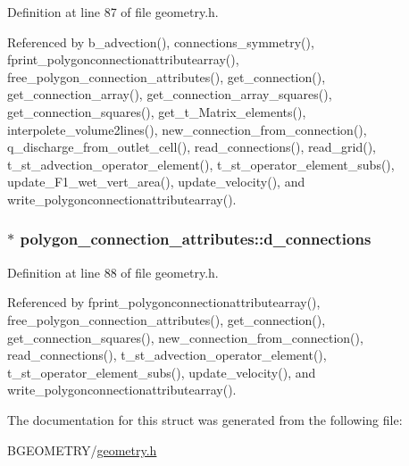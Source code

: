 Definition at line 87 of file geometry.\-h.



Referenced by b\-\_\-advection(), connections\-\_\-symmetry(), fprint\-\_\-polygonconnectionattributearray(), free\-\_\-polygon\-\_\-connection\-\_\-attributes(), get\-\_\-connection(), get\-\_\-connection\-\_\-array(), get\-\_\-connection\-\_\-array\-\_\-squares(), get\-\_\-connection\-\_\-squares(), get\-\_\-t\-\_\-\-Matrix\-\_\-elements(), interpolete\-\_\-volume2lines(), new\-\_\-connection\-\_\-from\-\_\-connection(), q\-\_\-discharge\-\_\-from\-\_\-outlet\-\_\-cell(), read\-\_\-connections(), read\-\_\-grid(), t\-\_\-st\-\_\-advection\-\_\-operator\-\_\-element(), t\-\_\-st\-\_\-operator\-\_\-element\-\_\-subs(), update\-\_\-\-F1\-\_\-wet\-\_\-vert\-\_\-area(), update\-\_\-velocity(), and write\-\_\-polygonconnectionattributearray().

\hypertarget{structpolygon__connection__attributes_a488769495fb2d8b79ae938414893f5b2}{
\subsubsection[{d\-\_\-connections}]{$\ast$ polygon\-\_\-connection\-\_\-attributes\-::d\-\_\-connections}}\label{structpolygon__connection__attributes_a488769495fb2d8b79ae938414893f5b2}


Definition at line 88 of file geometry.\-h.



Referenced by fprint\-\_\-polygonconnectionattributearray(), free\-\_\-polygon\-\_\-connection\-\_\-attributes(), get\-\_\-connection(), get\-\_\-connection\-\_\-squares(), new\-\_\-connection\-\_\-from\-\_\-connection(), read\-\_\-connections(), t\-\_\-st\-\_\-advection\-\_\-operator\-\_\-element(), t\-\_\-st\-\_\-operator\-\_\-element\-\_\-subs(), update\-\_\-velocity(), and write\-\_\-polygonconnectionattributearray().



The documentation for this struct was generated from the following file\-:\begin{DoxyCompactItemize}
\item 
B\-G\-E\-O\-M\-E\-T\-R\-Y/\hyperlink{geometry_8h}{geometry.\-h}\end{DoxyCompactItemize}
